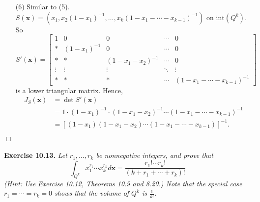 \documentclass{article}
\begin{document}
\begin{enumerate}
\item[(6)]
  Similar to (5).
  $S(\mathbf{x}) = (x_1, x_2(1-x_1)^{-1}, \ldots, x_k(1-x_1-\cdots-x_{k-1})^{-1})$
  on $\mathrm{int}(Q^k)$.
  So
  \[
    S'(\mathbf{x})
    =
    \begin{bmatrix}
      1      & 0            & 0                & \cdots & 0 \\
      *      & (1-x_1)^{-1} & 0                & \cdots & 0 \\
      *      & *            & (1-x_1-x_2)^{-1} & \cdots & 0 \\
      \vdots &  \vdots      & \vdots           & \ddots & \vdots \\
      *      & *            & *                & \cdots & (1-x_1-\cdots-x_{k-1})^{-1}
    \end{bmatrix}
  \]
  is a lower triangular matrix.
  Hence,
  \begin{align*}
    J_S(\mathbf{x})
    &= \det S'(\mathbf{x}) \\
    &= 1 \cdot (1-x_1)^{-1} \cdot (1-x_1-x_2)^{-1} \cdots (1-x_1-\cdots-x_{k-1})^{-1} \\
    &= [(1-x_1)(1-x_1-x_2) \cdots (1-x_1-\cdots-x_{k-1})]^{-1}.
  \end{align*}
\end{enumerate}
$\Box$ \\\\






\textbf{Exercise 10.13.}
\emph{Let $r_1, \ldots, r_k$ be nonnegative integers, and prove that
\[
  \int_{Q^k} x_1^{r_1} \cdots x_k^{r_k} d\mathbf{x}
  =
  \frac{r_1! \cdots r_k!}{(k+r_1+\cdots+r_k)!}
\]
(Hint: Use Exercise 10.12, Theorems 10.9 and 8.20.)
Note that the special case $r_1 = \cdots = r_k = 0$
shows that the volume of $Q^k$ is $\frac{1}{k!}$.} \\
\end{document}
